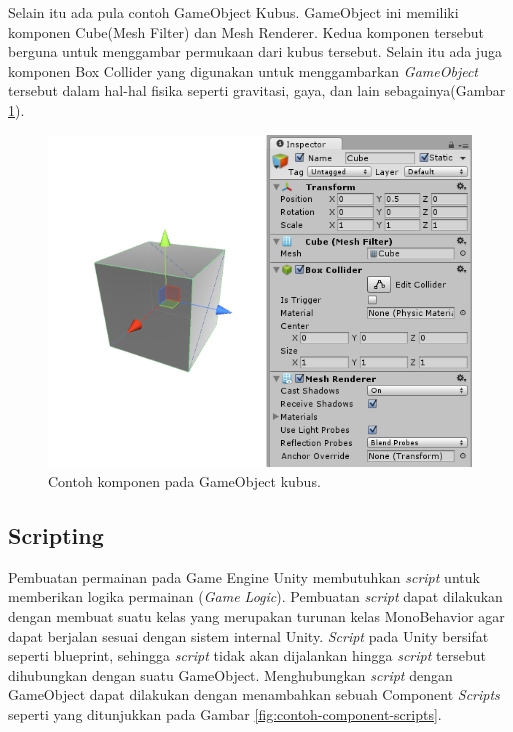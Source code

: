 Selain itu ada pula contoh GameObject Kubus. GameObject ini memiliki komponen Cube(Mesh Filter) dan Mesh Renderer. Kedua komponen tersebut berguna untuk menggambar permukaan dari kubus tersebut. Selain itu ada juga komponen Box Collider yang digunakan untuk menggambarkan \textit{GameObject} tersebut dalam hal-hal fisika seperti gravitasi, gaya, dan lain sebagainya(Gambar \ref{fig:contoh-component-pada-game-object2}).


\begin{figure}[htbp]
\centering
\includegraphics[scale=0.7]{Gambar/contoh-component-pada-game-object2.png}
\caption{Contoh komponen pada GameObject kubus.} 
\label{fig:contoh-component-pada-game-object2}
\end{figure}
 
\subsection{Scripting}

Pembuatan permainan pada Game Engine Unity membutuhkan \textit{script} untuk memberikan logika permainan (\textit{Game Logic}). Pembuatan \textit{script} dapat dilakukan dengan membuat suatu kelas yang merupakan turunan kelas MonoBehavior agar dapat berjalan sesuai dengan sistem internal Unity. \textit{Script} pada Unity bersifat seperti blueprint, sehingga \textit{script} tidak akan dijalankan hingga \textit{script} tersebut dihubungkan dengan suatu GameObject. Menghubungkan \textit{script} dengan GameObject dapat dilakukan dengan menambahkan sebuah Component \textit{Scripts} seperti yang ditunjukkan pada Gambar \ref{fig:contoh-component-scripts}.

